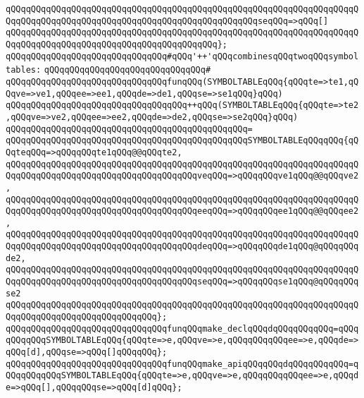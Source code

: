 \verb|qQQqqQQqqQQqqQQqqQQqqQQqqQQqqQQqqQQqqQQqqQQqqQQqqQQqqQQqqQQqqQQqqQQqqQQqqQQqqQQqqQQqqQQqqQQqqQQqqQQqqQQqqQQqqQQqqQQqqQQqseqQQq=>qQQq[]|\newline
\verb|qQQqqQQqqQQqqQQqqQQqqQQqqQQqqQQqqQQqqQQqqQQqqQQqqQQqqQQqqQQqqQQqqQQqqQQqqQQqqQQqqQQqqQQqqQQqqQQqqQQqqQQqqQQqqQQq};|\newline
\newline
\newline
\verb|qQQqqQQqqQQqqQQqqQQqqQQqqQQqqQQq#qQQq'++'qQQqcombinesqQQqtwoqQQqsymboltables:|\newline
\verb|qQQqqQQqqQQqqQQqqQQqqQQqqQQqqQQq#|\newline
\verb|qQQqqQQqqQQqqQQqqQQqqQQqqQQqqQQqfunqQQq(SYMBOLTABLEqQQq{qQQqte=>te1,qQQqve=>ve1,qQQqee=>ee1,qQQqde=>de1,qQQqse=>se1qQQq}qQQq)|\newline
\verb|qQQqqQQqqQQqqQQqqQQqqQQqqQQqqQQqqQQq++qQQq(SYMBOLTABLEqQQq{qQQqte=>te2,qQQqve=>ve2,qQQqee=>ee2,qQQqde=>de2,qQQqse=>se2qQQq}qQQq)|\newline
\verb|qQQqqQQqqQQqqQQqqQQqqQQqqQQqqQQqqQQqqQQqqQQqqQQq=|\newline
\verb|qQQqqQQqqQQqqQQqqQQqqQQqqQQqqQQqqQQqqQQqqQQqqQQqSYMBOLTABLEqQQqqQQq{qQQqteqQQq=>qQQqqQQqte1qQQq@@qQQqte2,|\newline
\verb|qQQqqQQqqQQqqQQqqQQqqQQqqQQqqQQqqQQqqQQqqQQqqQQqqQQqqQQqqQQqqQQqqQQqqQQqqQQqqQQqqQQqqQQqqQQqqQQqqQQqqQQqqQQqveqQQq=>qQQqqQQqve1qQQq@@qQQqve2,|\newline
\verb|qQQqqQQqqQQqqQQqqQQqqQQqqQQqqQQqqQQqqQQqqQQqqQQqqQQqqQQqqQQqqQQqqQQqqQQqqQQqqQQqqQQqqQQqqQQqqQQqqQQqqQQqqQQqeeqQQq=>qQQqqQQqee1qQQq@@qQQqee2,|\newline
\verb|qQQqqQQqqQQqqQQqqQQqqQQqqQQqqQQqqQQqqQQqqQQqqQQqqQQqqQQqqQQqqQQqqQQqqQQqqQQqqQQqqQQqqQQqqQQqqQQqqQQqqQQqqQQqdeqQQq=>qQQqqQQqde1qQQq@qQQqqQQqde2,|\newline
\verb|qQQqqQQqqQQqqQQqqQQqqQQqqQQqqQQqqQQqqQQqqQQqqQQqqQQqqQQqqQQqqQQqqQQqqQQqqQQqqQQqqQQqqQQqqQQqqQQqqQQqqQQqqQQqseqQQq=>qQQqqQQqse1qQQq@qQQqqQQqse2|\newline
\verb|qQQqqQQqqQQqqQQqqQQqqQQqqQQqqQQqqQQqqQQqqQQqqQQqqQQqqQQqqQQqqQQqqQQqqQQqqQQqqQQqqQQqqQQqqQQqqQQqqQQq};|\newline
\newline
\verb|qQQqqQQqqQQqqQQqqQQqqQQqqQQqqQQqfunqQQqmake_declqQQqdqQQqqQQqqQQq=qQQqqQQqqQQqSYMBOLTABLEqQQq{qQQqte=>e,qQQqve=>e,qQQqqQQqqQQqee=>e,qQQqde=>qQQq[d],qQQqse=>qQQq[]qQQqqQQq};|\newline
\verb|qQQqqQQqqQQqqQQqqQQqqQQqqQQqqQQqfunqQQqmake_apiqQQqqQQqdqQQqqQQqqQQq=qQQqqQQqqQQqSYMBOLTABLEqQQq{qQQqte=>e,qQQqve=>e,qQQqqQQqqQQqee=>e,qQQqde=>qQQq[],qQQqqQQqse=>qQQq[d]qQQq};|\newline
